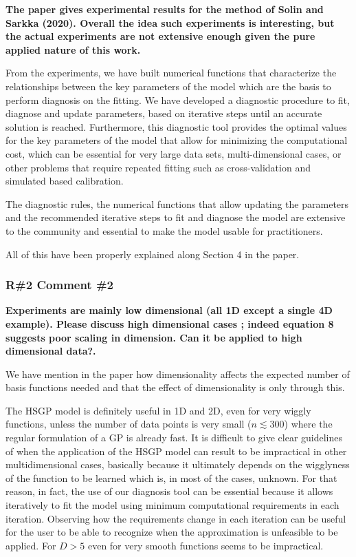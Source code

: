 \documentclass[11pt]{report}
\begin{document}
\textbf{The paper gives experimental results for the method of Solin and Sarkka  (2020). Overall the idea such experiments is interesting, but the actual experiments are not extensive enough given the pure applied nature of this work.}

From the experiments, we have built numerical functions that characterize the relationships between the key parameters of the model which are the basis to perform diagnosis on the fitting. We have developed a diagnostic procedure to fit, diagnose and update parameters, based on iterative steps until an accurate solution is reached. Furthermore, this diagnostic tool provides the optimal values for the key parameters of the model that allow for minimizing the computational cost, which can be essential for very large data sets, multi-dimensional cases, or other problems that require repeated fitting such as cross-validation and simulated based calibration.

The diagnostic rules, the numerical functions that allow updating the parameters and the recommended iterative steps to fit and diagnose the model are extensive to the community and essential to make the model usable for practitioners.

All of this have been properly explained along Section 4 in the paper.

\subsubsection*{R\#2 Comment \#2}

\textbf{Experiments are mainly low dimensional (all 1D except a single 4D example). Please discuss high dimensional cases ; indeed equation 8 suggests poor scaling in dimension. Can it be applied to high dimensional data?.} 

We have mention in the paper how dimensionality affects the expected number of basis functions needed and that the effect of dimensionality is only through this. 

The HSGP model is definitely useful in 1D and 2D, even for very wiggly functions, unless the number of data points is very small ($n \lesssim 300$) where the regular formulation of a GP is already fast. It is difficult to give clear guidelines of when the application of the HSGP model can result to be impractical in other multidimensional cases, basically because it ultimately depends on the wigglyness of the function to be learned which is, in most of the cases, unknown. For that reason, in fact, the use of our diagnosis tool can be essential because it allows iteratively to fit the model using minimum computational requirements in each iteration. Observing how the requirements change in each iteration can be useful for the user to be able to recognize when the approximation is unfeasible to be applied. For $D>5$ even for very smooth functions seems to be impractical.
\end{document}

